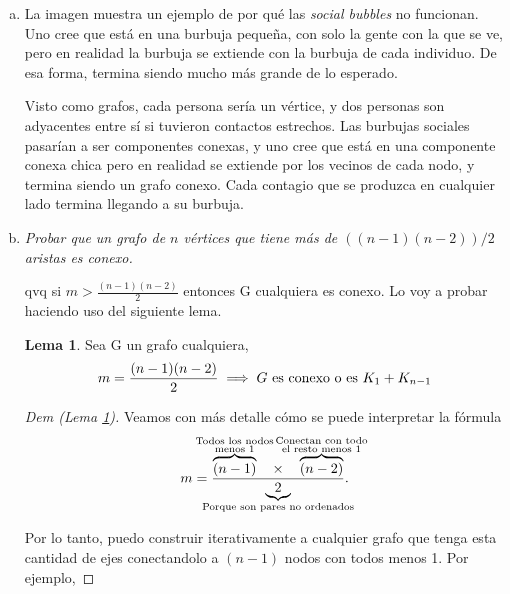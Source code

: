 \documentclass[12pt, a4paper]{report}
\theoremstyle{definition} %
\newtheorem{lemma}{Lema}
\begin{document}
\begin{enumerate}[a)]
    \item La imagen muestra un ejemplo de por qué las \textit{social bubbles} no funcionan. Uno cree que está en una burbuja pequeña, con solo la gente con la que se ve, pero en realidad la burbuja se extiende con la burbuja de cada individuo. De esa forma, termina siendo mucho más grande de lo esperado.
    
    Visto como grafos, cada persona sería un vértice, y dos personas son adyacentes entre sí si tuvieron contactos estrechos. Las burbujas sociales pasarían a ser componentes conexas, y uno cree que está en una componente conexa chica pero en realidad se extiende por los vecinos de cada nodo, y termina siendo un grafo conexo. Cada contagio que se produzca en cualquier lado termina llegando a su burbuja.

    \item \textit{Probar que un grafo de $n$ vértices que tiene más de $((n-1)(n-2))/2$ aristas es conexo.}
    
    qvq si $m > \frac{(n-1)(n-2)}{2}$ entonces G cualquiera es conexo. Lo voy a probar haciendo uso del siguiente lema.

    \begin{lemma}\label{3/lemma}
        Sea G un grafo cualquiera,
        \[
            m = \frac{(n-1)(n-2)}{2} 
            \implies 
            G \text{ es conexo o es } K_1 + K_{n-1} \\
        \]
    \end{lemma}

    \begin{proof}[Dem (Lema \ref{3/lemma})]
        Veamos con más detalle cómo se puede interpretar la fórmula
        \[
            m = \frac
            {
                \overbrace{(n-1)}^{\mathclap{\substack{\text{Todos los nodos}\\\text{menos 1}}}}
                \quad
                \times
                \quad
                \overbrace{(n-2)}^{\mathclap{\substack{\text{Conectan con todo}\\\text{el resto menos 1}}}}
            }
            {
                \underbrace{2}_{\mathclap{\text{Porque son pares no ordenados}}}
            }.
        \]

        Por lo tanto, puedo construir iterativamente a cualquier grafo que tenga esta cantidad de ejes conectandolo a $(n - 1)$ nodos con todos menos 1. Por ejemplo,


\end{proof}
\end{enumerate}
\end{document}
